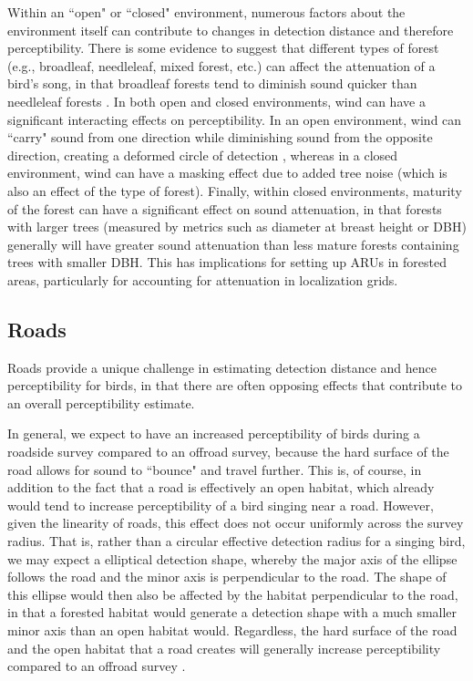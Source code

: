 \par Within an ``open" or ``closed" environment, numerous factors about the environment itself can contribute to changes in detection distance and therefore perceptibility.
There is some evidence to suggest that different types of forest (e.g., broadleaf, needleleaf, mixed forest, etc.) can affect the attenuation of a bird's song, in that broadleaf forests tend to diminish sound quicker than needleleaf forests \citep{schieck_biased_1997}.
In both open and closed environments, wind can have a significant interacting effects on perceptibility.
In an open environment, wind can ``carry" sound from one direction while diminishing sound from the opposite direction, creating a deformed circle of detection \citep{rigby_factors_2019}, whereas in a closed environment, wind can have a masking effect due to added tree noise (which is also an effect of the type of forest).
Finally, within closed environments, maturity of the forest can have a significant effect on sound attenuation, in that forests with larger trees (measured by metrics such as diameter at breast height or DBH) generally will have greater sound attenuation than less mature forests containing trees with smaller DBH.
This has implications for setting up ARUs in forested areas, particularly for accounting for attenuation in localization grids.

\subsection{Roads}

\par Roads provide a unique challenge in estimating detection distance and hence perceptibility for birds, in that there are often opposing effects that contribute to an overall perceptibility estimate.

\par In general, we expect to have an increased perceptibility of birds during a roadside survey compared to an offroad survey, because the hard surface of the road allows for sound to ``bounce" and travel further.
This is, of course, in addition to the fact that a road is effectively an open habitat, which already would tend to increase perceptibility of a bird singing near a road.
However, given the linearity of roads, this effect does not occur uniformly across the survey radius.
That is, rather than a circular effective detection radius for a singing bird, we may expect a elliptical detection shape, whereby the major axis of the ellipse follows the road and the minor axis is perpendicular to the road.
The shape of this ellipse would then also be affected by the habitat perpendicular to the road, in that a forested habitat would generate a detection shape with a much smaller minor axis than an open habitat would.
Regardless, the hard surface of the road and the open habitat that a road creates will generally increase perceptibility compared to an offroad survey \citep{solymos_lessons_2020}.

